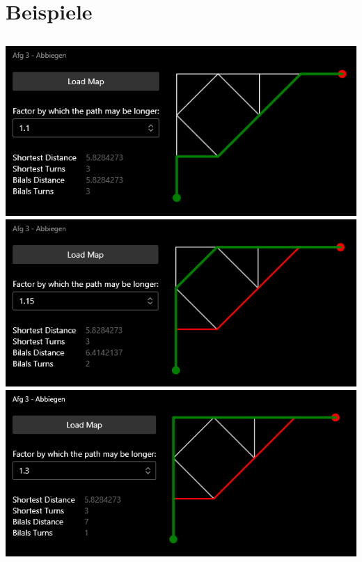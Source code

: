 \documentclass{article}
\theoremstyle{nonumberplain}
\begin{document}
\section{Beispiele}

\newcommand{\incgra}[1]{
    \begin{center}
        \makebox[\textwidth]{\texttt{[image: \#1]}}
    \end{center}
}

\subsection{}

\begin{center}
\includegraphics{examples/0_10.png}
\includegraphics{examples/0_15.png}
\includegraphics{examples/0_30.png}
\end{center}
\end{document}
